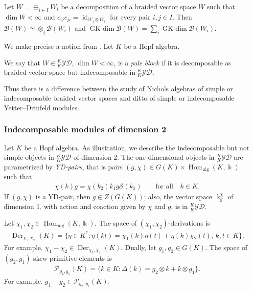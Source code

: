 \documentclass[pdftex]{sigma}
\numberwithin{equation}{section}
\newcommand{\Der}{\operatorname{Der}}
\newcommand{\GK}{\operatorname{GK-dim}}
\newcommand{\Hom}{\operatorname{Hom}}
\newcommand{\id}{\operatorname{id}}
\newcommand{\toba}{\mathscr B}
\newcommand{\Pc}{{\mathcal{P}}}
\newcommand{\Ss}{\mathcal{S}}
\newcommand{\yd}[1]{{}_{#1}^{#1}\mathcal{YD}}
\begin{document}
\begin{Remark}\label{obs:connected} Let $W = \oplus_{i \in I} W_i$ be a decomposition of a
braided vector space $W$ such that $\dim W < \infty$ and
$c_{ij}c_{ji} = \id_{W_j \otimes W_i}$ for every pair $i,j \in I$. Then
$\toba(W) \simeq \underline{\otimes}_i\toba(W_i)$ \cite{gr-jalg} and $\GK\toba(W) = \sum_i \GK \toba(W_i)$.
\end{Remark}



We make precise a notion from \cite{AAH-triang}. Let $K$ be a Hopf algebra.

\begin{Definition}%
We say that
$W \in \yd{K}$, $\dim W < \infty$, is a \emph{pale block} if it is decomposable as braided vector space but indecomposable in $\yd{K}$.
\end{Definition}

Thus there is a difference between the study of Nichols algebras of simple or indecomposable
braided vector spaces and ditto of simple or indecomposable Yetter--Drinfeld modules.


\subsubsection{Indecomposable modules of dimension 2}%
Let $K$ be a Hopf algebra.
As illustration, we describe the indecomposable but not simple objects in $\yd{K}$ of dimension 2.
The one-dimensional objects in $\yd{K}$ are parametrized by
\emph{YD-pairs}, that is pairs
$(g, \chi) \in G(K) \times \Hom_{\text{alg}}(K, \Bbbk)$ such that
\begin{align}\label{eq:yd-pair}
\chi(k) g = \chi(k_{2}) k_{1} g \Ss(k_{3})\qquad \text{for all}\quad k\in K.
\end{align}
If $(g, \chi)$ is a YD-pair, then $g\in Z(G(K))$; also, the vector space $\Bbbk_g^{\chi}$ of dimension 1,
with action and coaction given by $\chi $ and $g$, is in $\yd{K}$.

Let $\chi_1, \chi_2 \in \Hom_{\text{alg}}(K, \Bbbk)$. The space of $(\chi_1,\chi_2)$-derivations is
\begin{align*}
\Der_{\chi_1,\chi_2}(K) = \{\eta\in K^*\colon \eta(kt) = \chi_1(k)\eta(t) + \eta(k)\chi_2(t), \, k,t \in K\}.
\end{align*}
For example, $\chi_1 - \chi_2 \in \Der_{\chi_1,\chi_2}(K)$.
Dually, let $g_1, g_2 \in G(K)$. The space of $(g_2,g_1)$-skew primitive elements is
\begin{align*}
\Pc_{g_2,g_1}(K) = \{k\in K\colon \Delta(k) = g_2\otimes k + k \otimes g_1\}.
\end{align*}
For example, $g_1 - g_2 \in \Pc_{g_2,g_1}(K)$.
\end{document}
